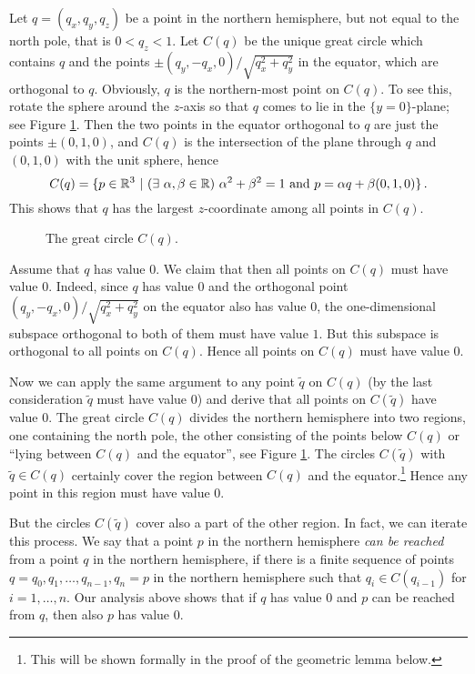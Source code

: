 Let $q=(q_x,q_y,q_z)$ be a point in the northern
hemisphere, but not equal to the north pole, that is
$0< q_z < 1$. Let $C(q)$ be the unique
great circle which contains $q$ and the points
$\pm(q_y,-q_x,0)/\sqrt{q_x^2+q_y^2}$ in the equator, which are orthogonal
to $q$.
Obviously,  $q$ is the northern-most point on $C(q)$.
To see this, rotate the sphere around the $z$-axis
so that $q$ comes to lie in the $\{y=0\}$-plane;
see Figure \ref{figure:greatcircle}.
%
%
Then the two points in the equator orthogonal to $q$ are
just the points $\pm(0,1,0)$, and $C(q)$ is the intersection
of the plane through $q$ and $(0,1,0)$ with the unit sphere, hence
\[C(q) = \{p \in {\Bbb R}^3 \ | \ (\exists \ \alpha,\beta \in {\Bbb R}) \
     \alpha^2 + \beta^2 =1 \ \mbox{\rm and } p=\alpha q + \beta
     (0,1,0) \}\,.\]
This shows that $q$ has the largest $z$-coordinate among all
points in $C(q)$.

\begin{figure}[htbp]
\centerline{ \epsfxsize12cm  }
\vskip-2cm
\caption{The great circle $C(q)$.}
\label{figure:greatcircle}
\end{figure}

Assume that $q$ has value $0$. We claim that then all points
on $C(q)$ must have value $0$. Indeed, since $q$ has value
$0$ and the orthogonal point $(q_y,-q_x,0)/\sqrt{q_x^2+q_y^2}$
on the equator also has value $0$, the one-dimensional subspace
orthogonal to both of them must have value $1$.
But this subspace is orthogonal to all points on $C(q)$.
Hence all points on $C(q)$ must have value $0$.

Now we can apply the same argument to any point $\tilde{q}$ on
$C(q)$ (by the last consideration $\tilde{q}$ must have value $0$)
and derive that all points on $C(\tilde{q})$ have value $0$.
The great circle $C(q)$ divides the northern hemisphere into two
regions, one containing the north pole,
the other consisting of the points below $C(q)$ or
``lying between $C(q)$ and the equator'',
see Figure \ref{figure:greatcircle}.
The circles $C(\tilde{q})$ with $\tilde{q} \in C(q)$
certainly cover the region between $C(q)$ and the equator.\footnote{This will
be shown formally in the proof of the geometric lemma below.}
Hence any point in this region must have value $0$.

But the circles $C(\tilde{q})$ cover also a part
of the other region. In fact, we can iterate this process.
We say that a point $p$ in the northern hemisphere
{\em can be reached} from a point $q$ in the
northern hemisphere, if there is a finite
sequence of points $q=q_0, q_1, \ldots, q_{n-1}, q_n=p$
in the northern hemisphere such that $q_i\in C(q_{i-1})$
for $i=1,\ldots,n$.
Our analysis above shows that if $q$ has value $0$ and
$p$ can be reached from $q$, then also $p$ has value $0$.

